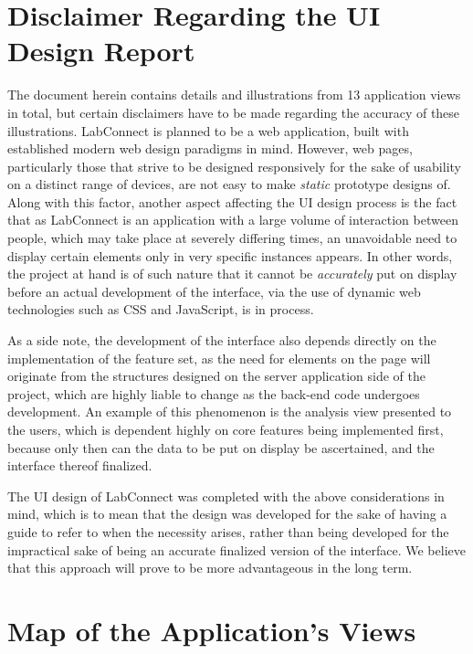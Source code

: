 \documentclass[a4paper, 12pt]{article}
\begin{document}
    \section{Disclaimer Regarding the UI Design Report}

    The document herein contains details and illustrations from 13 application views in total, but certain disclaimers have to be made
    regarding the accuracy of these illustrations.
    LabConnect is planned to be a web application, built with established modern web design paradigms in mind. However, web pages,
    particularly those that strive to be designed responsively for the sake of usability on a distinct range of devices, are
    not easy to make \emph{static} prototype designs of. Along with this factor, another aspect affecting the UI design process is the fact
    that as LabConnect is an application with a large volume of interaction between people, which may take place at severely
    differing times, an unavoidable need to display certain elements only in very specific instances appears. In other words, the project
    at hand is of such nature that it cannot be \emph{accurately} put on display before an actual development of the interface, via
    the use of dynamic web technologies such as CSS and JavaScript, is in process.

    As a side note, the development of the interface also depends directly on the implementation of the feature set,
    as the need for elements on the page will originate from the structures designed on the server application side of the project, which
    are highly liable to change as the back-end code undergoes development. An example of this phenomenon is the analysis view presented to the users,
    which is dependent highly on core features being implemented first, because only then can the data to be put on display be ascertained,
    and the interface thereof finalized.

    The UI design of LabConnect was completed with the above considerations in mind, which is to mean that the design was developed
    for the sake of having a guide to refer to when the necessity arises, rather than being developed for the impractical sake of being an accurate
    finalized version of the interface. We believe that this approach will prove to be more advantageous in the long term.

    \pagebreak

    \section{Map of the Application's Views}
\end{document}
